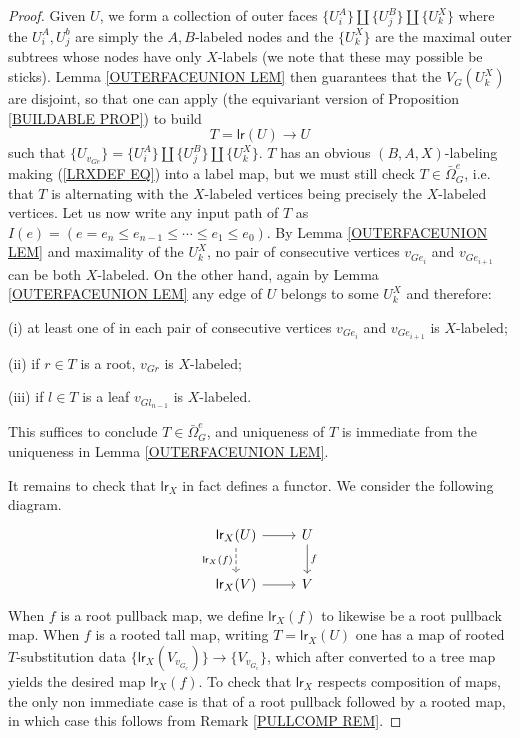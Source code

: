 \documentclass[a4paper,10pt]{article}%
\begin{document}
\begin{proof}
	Given $U$, we form a collection of outer faces
	$\{U_i^A\} \amalg \{U_j^B\} \amalg \{U_k^X\}$
where the $U_i^A, U_j^b$ are simply the $A,B$-labeled nodes
and the $\{U_k^X\}$ are the maximal outer subtrees whose nodes have only $X$-labels (we note that these may possible be sticks). 
Lemma \ref{OUTERFACEUNION LEM} then guarantees that the $V_G(U_k^{X})$ are disjoint, so that one can apply (the equivariant version of Proposition \ref{BUILDABLE PROP})
to build 
\begin{equation}\label{LRXDEF EQ}
T = \mathsf{lr}(U) \to U
\end{equation}
such that $\{U_{v_{G e}}\} = \{U_i^A\} \amalg \{U_j^B\} \amalg \{U_k^X\}$. $T$ has an obvious $(B,A,X)$-labeling making 
(\ref{LRXDEF EQ}) into a label map, but we must still check $T \in \bar{\Omega}^{e}_G$, i.e. that $T$ is alternating with the $X$-labeled vertices being precisely the $X$-labeled vertices.
Let us now write any input path of $T$ as 
$I(e) = (e = e_n \leq e_{n-1} \leq \cdots \leq e_1 \leq e_0)$.
By Lemma \ref{OUTERFACEUNION LEM} and maximality of the $U_k^X$, no pair of consecutive vertices $v_{Ge_i}$ and $v_{Ge_{i+1}}$ can be both $X$-labeled.
On the other hand, again by Lemma \ref{OUTERFACEUNION LEM} any edge of $U$ belongs to some $U^X_k$ and therefore:
\begin{inparaenum}
	\item[(i)] at least one of in each pair of consecutive vertices $v_{Ge_i}$ and $v_{Ge_{i+1}}$ is $X$-labeled;
	\item[(ii)] if $r \in T$ is a root, $v_{G r}$ is $X$-labeled;
	\item[(iii)] if $l \in T$ is a leaf $v_{G l_{n-1}}$ is $X$-labeled.
\end{inparaenum}
This suffices to conclude $T \in \bar{\Omega}_{G}^e$, and
uniqueness of $T$ is immediate from the uniqueness in Lemma \ref{OUTERFACEUNION LEM}. 


It remains to check that $\mathsf{lr}_X$ in fact defines a functor. We consider the following diagram.
\[
\begin{tikzcd}
	\mathsf{lr}_X(U) \ar{r} \ar[dashed]{d}[swap]{\mathsf{lr}_X(f)} & U \ar{d}{f}
\\
	\mathsf{lr}_X(V) \ar{r} & V
\end{tikzcd}
\]
When $f$ is a root pullback map, we define $\mathsf{lr}_X(f)$ to likewise be a root pullback map. When $f$ is a rooted tall map, writing $T=\mathsf{lr}_X(U)$ one has a map of rooted $T$-substitution data
$\{\mathsf{lr}_X(V_{v_{G_e}})\} \to \{V_{v_{G_e}}\}$,
which after converted to a tree map yields the desired map 
$\mathsf{lr}_X(f)$.
To check that $\mathsf{lr}_X$ respects composition of maps, 
the only non immediate case is that of a root pullback followed by a rooted map, in which case this follows from Remark \ref{PULLCOMP REM}.
\end{proof}
\end{document}
